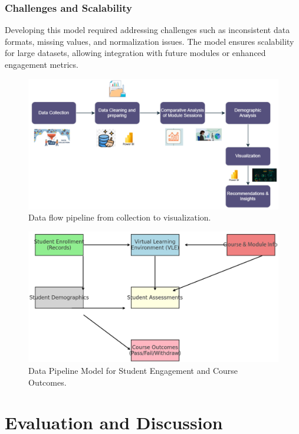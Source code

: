\subsubsection{Challenges and Scalability}
Developing this model required addressing challenges such as inconsistent data formats, missing values, and normalization issues. The model ensures scalability for large datasets, allowing integration with future modules or enhanced engagement metrics.

\begin{figure}[h]
    \centering
    \includegraphics[width=\linewidth]{photo/method.PNG}
    \caption{Data flow pipeline from collection to visualization.}
    \label{fig:method}
\end{figure}

\begin{figure}[h]
    \centering
    \includegraphics[width=\linewidth]{photo/relations.PNG}
    \caption{Data Pipeline Model for Student Engagement and Course Outcomes.}
    \label{fig:relations}
\end{figure}

\section{Evaluation and Discussion}


